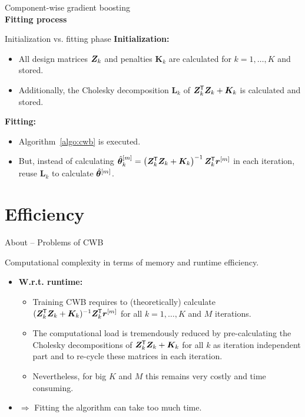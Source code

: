 \documentclass[t,10pt]{beamer}
\newcommand{\penMat}{\bm{K}}
\newcommand{\fSlide}[2]{
\begin{frame}[plain]{}%
  \vspace{4cm}%
  \Large #1\\[0.2cm]%
  {\LARGE\textbf{#2}}%
	\addtocounter{framenumber}{-1}%
\end{frame}%
}
\begin{document}
\fSlide{Component-wise gradient boosting}{Fitting process}

\begin{frame}{Initialization vs. fitting phase}
  \textbf{Initialization:}
  \begin{itemize}
    \item
      All design matrices $\bm{Z}_k$ and penalties $\penMat_k$ are calculated for $k = 1, \dots, K$ and stored.
    \item
      Additionally, the Cholesky decomposition $\bm{L}_k$ of $\design_k^\tran \design_k + \penMat_k$ is calculated and stored.
  \end{itemize}
  \textbf{Fitting:}
  \begin{itemize}
    \item
      Algorithm~\ref{algo:cwb} is executed.
    \item
      But, instead of calculating $\hat{\bm{\theta}}^{[m]}_k = \left(\bm{Z}_k^{\mkern-1.5mu\mathsf{T}} \bm{Z}_k + \bm{K}_k\right)^{-1} \bm{Z}^{\mkern-1.5mu\mathsf{T}}_k \bm{r}^{[m]}$ in each iteration, reuse $\bm{L}_k$ to calculate $\hat{\bm{\theta}}^{[m]}$.
  \end{itemize}

\end{frame}





\section{Efficiency}

\begin{frame}{About -- Problems of CWB}

  Computational complexity in terms of memory and runtime efficiency.
  \begin{itemize}
    \item \textbf{W.r.t. runtime:}
    \begin{itemize}
      \item Training CWB requires to (theoretically) calculate $(\bm{Z}_k^{\mkern-1.5mu\mathsf{T}} \bm{Z}_k + \bm{K}_k)^{-1}\bm{Z}_k^{\mkern-1.5mu\mathsf{T}} \bm{r}^{[m]}$ for all $k = 1, \dots, K$ and $M$ iterations.
      \item The computational load is tremendously reduced by pre-calculating the Cholesky decompositions of $\bm{Z}_k^{\mkern-1.5mu\mathsf{T}} \bm{Z}_k + \bm{K}_k$ for all $k$ as iteration independent part and to re-cycle these matrices in each iteration.
      \item Nevertheless, for big $K$ and $M$ this remains very costly and time consuming.
    \end{itemize}
    \item[] $\Rightarrow$ Fitting the algorithm can take too much time.
  \end{itemize}
\end{frame}
\end{document}
